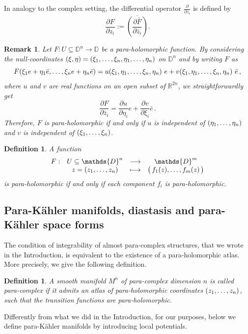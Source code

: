 \documentclass{article}
\newtheorem{df}[thm]{Definition}
\newtheorem{rem}[thm]{Remark}
\newcommand{\R}{\mathds{R}}
\newcommand{\de}{\partial}
\newcommand{\pk}{para-K\"ahler }
\newcommand{\D}{\mathds{D}}
\begin{document}
In analogy to the complex setting, the differential operator $\frac{\de}{\de z_i}$ is defined by
\begin{equation}\label{dez}
\frac{\de F}{\de z_i}:=\overline{\left( \frac{\de \bar F}{\de \bar z_i}\right)}.
\end{equation}
\begin{rem}\label{ph1}
Let  $F:U\subseteq \D^n\to\D$ be a para-holomorphic function. By considering the null-coordinates $(\xi,\eta)=(\xi_1,\mathellipsis,\xi_n,\eta_1,\mathellipsis,\eta_n)$ on $\D^n$ and by writing $F$ as
$$
F(\xi_1e+\eta_1\bar e,\mathellipsis,\xi_n e+\eta_n\bar e)=u(\xi_1,\eta_1,\mathellipsis,\xi_n ,\eta_n)\ e+ v(\xi_1,\eta_1,\mathellipsis,\xi_n ,\eta_n)\ \bar e\,,
$$ 
where $u$ and $v$ are real functions on an open subset of $\R^{2n}$, we straightforwardly get
$$
\frac{\de F}{\de\bar z_i}=\frac{\de u}{\de \eta_i}e+\frac{\de v}{\de \xi_i}\bar e\,.
$$
Therefore, $F$ is para-holomorphic if and only if $u$ is independent of $(\eta_1,\mathellipsis,\eta_n)$  and $v$ is independent of  $(\xi_1,\mathellipsis,\xi_n)$.
\end{rem}
\begin{df}\label{ph2}
A function 
$$
\begin{array}{rccc}
F:&U\subseteq \D^n&\longrightarrow&\D^m\\
& z=(z_1,\mathellipsis,z_n)&\longmapsto&\big(\, f_1(z),\mathellipsis,f_m(z)\,\big)
\end{array}
$$ 
is para-holomorphic if and only if each component $f_i$ is para-holomorphic.
\end{df}




\subsection{Para-K\"ahler  manifolds, diastasis and \pk space forms}\label{sec.pk.diastasis}

The condition of integrability of almost para-complex structures, that we wrote in the Introduction, is equivalent to the existence of a para-holomorphic atlas. More precisely, we give the following definition.
\begin{df}
A smooth manifold $M^n$ of para-complex dimension $n$ is called \emph{para-complex} if it admits an atlas of para-holomorphic coordinates $(z_1,\mathellipsis,z_n)$, such that the transition functions are para-holomorphic.
\end{df}

Differently from what we did in the Introduction,  for our purposes, below we define \pk manifolds by introducing local potentials.
\end{document}

